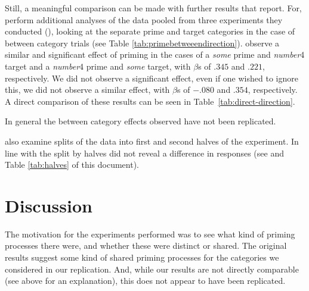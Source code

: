 \documentclass[10pt]{article}
\begin{document}
\begin{multicols}{2}
Still, a meaningful comparison can be made with further results that \citeauthor{Bott:2016aa} report.
For, \citeauthor{Bott:2016aa}  perform additional analyses of the data pooled from three experiments they conducted (\citeyear[132--133]{Bott:2016aa}), looking at the separate prime and target categories in the case of between category trials (see Table \ref{tab:primebetweeendirection}).
\citeauthor{Bott:2016aa} observe a similar and significant effect of priming in the cases of a \emph{some} prime and \emph{number}4 target and a \emph{number}4 prime and \emph{some} target, with \(\beta\)s of \(.345\) and \(.221\), respectively.
We did not observe a significant effect, even if one wished to ignore this, we did not observe a similar effect, with \(\beta\)s of \(-.080\) and \(.354\), respectively.
A direct comparison of these results can be seen in Table~\ref{tab:direct-direction}.

In general the between category effects \citeauthor{Bott:2016aa} observed have not been replicated.

\citeauthor{Bott:2016aa} also examine splits of the data into first and second halves of the experiment.
In line with \citeauthor{Bott:2016aa} the split by halves did not reveal a difference in responses (see \textcite[Table 4, 134]{Bott:2016aa} and Table \ref{tab:halves} of this document).

\section{Discussion}
\label{sec:discussion}


The motivation for the experiments \citeauthor{Bott:2016aa} performed was to see what kind of priming processes there were, and whether these were distinct or shared.
The original results suggest some kind of shared priming processes for the categories we considered in our replication.
And, while our results are not directly comparable (see above for an explanation), this does not appear to have been replicated.


\end{multicols}
\end{document}
